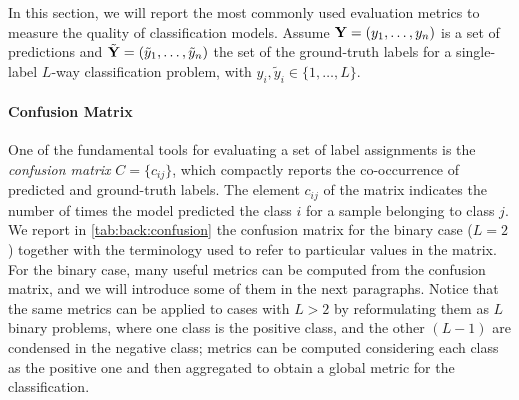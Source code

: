 In this section, we will report the most commonly used evaluation metrics to measure the quality of classification models.
Assume $\mathbf{Y} = (y_1, \ldots, y_n)$ is a set of predictions and $\tilde{\mathbf{Y}} = (\tilde{y}_1, \ldots, \tilde{y}_n)$ the set of the ground-truth labels for a single-label $L$-way classification problem, with $y_i, \tilde{y}_i \in \{1, \ldots, L\}$. %

\paragraph{Confusion Matrix}
One of the fundamental tools for evaluating a set of label assignments is the \emph{confusion matrix} $C = \{c_{ij}\}$, which compactly reports the co-occurrence of predicted and ground-truth labels.
The element $c_{ij}$ of the matrix indicates the number of times the model predicted the class $i$ for a sample belonging to class $j$.
We report in \ref{tab:back:confusion} the confusion matrix for the binary case ($L=2$) together with the terminology used to refer to particular values in the matrix.
For the binary case, many useful metrics can be computed from the confusion matrix, and we will introduce some of them in the next paragraphs.
Notice that the same metrics can be applied to cases with $L > 2$ by reformulating them as $L$ binary problems, where one class is the positive class, and the other $(L-1)$ are condensed in the negative class;
metrics can be computed considering each class as the positive one and then aggregated to obtain a global metric for the classification.

